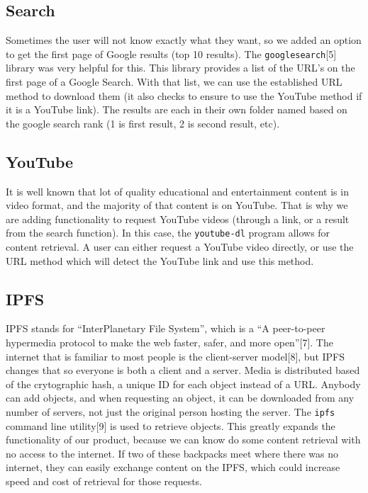 \documentclass{article}
\begin{document}
\subsection{Search}

Sometimes the user will not know exactly what they want, so we added
an option to get the first page of Google results (top 10
results). The \texttt{googlesearch}[5] library was very helpful for
this. This library provides a list of the URL's on the first page of a
Google Search. With that list, we can use the established URL method
to download them (it also checks to ensure to use the YouTube method
if it is a YouTube link).
The results are each in their own folder named
based on the google search rank (1 is first result, 2 is second
result, etc). 

\subsection{YouTube}

It is well known that lot of quality educational and entertainment
content is in video format, and the majority of that content is on
YouTube. That is why we are adding functionality to request YouTube
videos (through a link, or a result from the search function). In this
case, the \texttt{youtube-dl} program allows for content retrieval. A
user can either request a YouTube video directly, or use the URL
method which will detect the YouTube link and use this method.

\subsection{IPFS}
IPFS stands for ``InterPlanetary File System'', which is a ``A
peer-to-peer hypermedia protocol to make the web faster, safer, and
more open''[7]. The internet that is familiar to most people is the
client-server model[8], but IPFS changes that so everyone is both a
client and a server. Media is distributed based of the crytographic
hash, a unique ID for each object instead of a URL. Anybody can add
objects, and when requesting an object, it can be downloaded from any
number of servers, not just the original person hosting the
server. The \texttt{ipfs} command line utility[9] is used to retrieve
objects. This greatly expands the functionality of our product,
because we can know do some content retrieval with no access to the
internet. If two of these backpacks meet where there was no internet,
they can easily exchange content on the IPFS, which could increase
speed and cost of retrieval for those requests.
\end{document}
